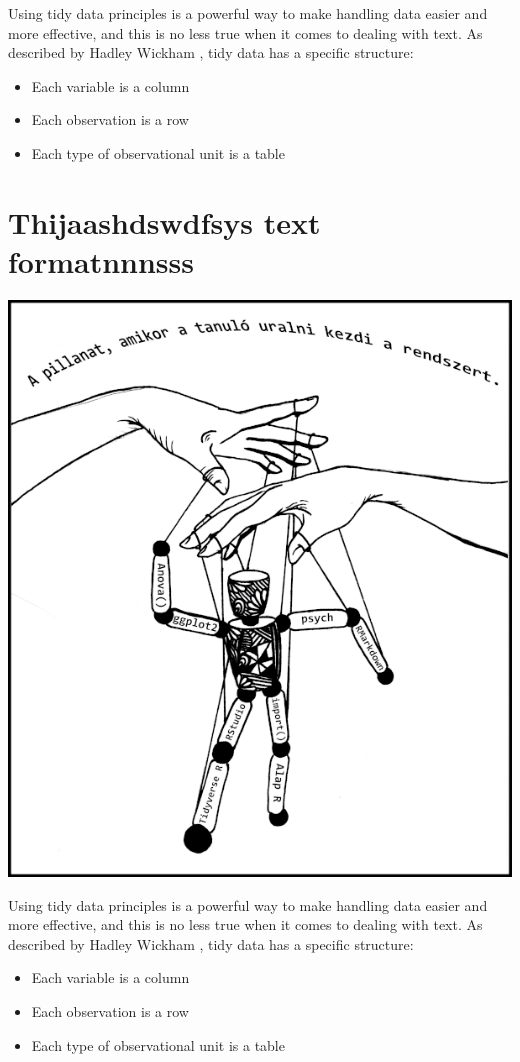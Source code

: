 \documentclass[
]{book}
\providecommand{\tightlist}{%
  \setlength{\itemsep}{0pt}\setlength{\parskip}{0pt}}
\begin{document}
Using tidy data principles is a powerful way to make handling data easier and more effective, and this is no less true when it comes to dealing with text. As described by Hadley Wickham \citep{tidydata}, tidy data has a specific structure:

\begin{itemize}
\tightlist
\item
  Each variable is a column
\item
  Each observation is a row
\item
  Each type of observational unit is a table
\end{itemize}

\hypertarget{thijaashdswdfsys-text-formatnnnsss}{%
\chapter{Thijaashdswdfsys text formatnnnsss}\label{thijaashdswdfsys-text-formatnnnsss}}

\begin{center}\includegraphics[width=0.9\linewidth]{images/ch_11_small} \end{center}

Using tidy data principles is a powerful way to make handling data easier and more effective, and this is no less true when it comes to dealing with text. As described by Hadley Wickham \citep{tidydata}, tidy data has a specific structure:

\begin{itemize}
\tightlist
\item
  Each variable is a column
\item
  Each observation is a row
\item
  Each type of observational unit is a table
\end{itemize}
\end{document}
